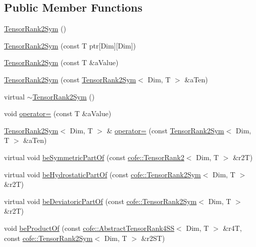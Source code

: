 \subsection*{Public Member Functions}
\begin{DoxyCompactItemize}
\item 
\hyperlink{classcofe_1_1TensorRank2Sym_a5c959003b2f6cd9ece627399bd45835e}{Tensor\-Rank2\-Sym} ()
\item 
\hyperlink{classcofe_1_1TensorRank2Sym_ad009c20f62a3c7164308ced29b4cca99}{Tensor\-Rank2\-Sym} (const T ptr\mbox{[}Dim\mbox{]}\mbox{[}Dim\mbox{]})
\item 
\hyperlink{classcofe_1_1TensorRank2Sym_a41a6d3b947aa0fe214d4c835df39216e}{Tensor\-Rank2\-Sym} (const T \&a\-Value)
\item 
\hyperlink{classcofe_1_1TensorRank2Sym_a47b1dc72944a7061e2a4b5648ad70949}{Tensor\-Rank2\-Sym} (const \hyperlink{classcofe_1_1TensorRank2Sym}{Tensor\-Rank2\-Sym}$<$ Dim, T $>$ \&a\-Ten)
\item 
virtual \hyperlink{classcofe_1_1TensorRank2Sym_aa21acff1313916623564e9eaaca67dbd}{$\sim$\-Tensor\-Rank2\-Sym} ()
\item 
void \hyperlink{classcofe_1_1TensorRank2Sym_a3ada6adac59a547889a8404cc3bc7c39}{operator=} (const T \&a\-Value)
\item 
\hyperlink{classcofe_1_1TensorRank2Sym}{Tensor\-Rank2\-Sym}$<$ Dim, T $>$ \& \hyperlink{classcofe_1_1TensorRank2Sym_a529b71c78891ef9a00c6d2515c812d5c}{operator=} (const \hyperlink{classcofe_1_1TensorRank2Sym}{Tensor\-Rank2\-Sym}$<$ Dim, T $>$ \&a\-Ten)
\item 
virtual void \hyperlink{classcofe_1_1TensorRank2Sym_a1c33be3b42add56b28659f985aa965bf}{be\-Symmetric\-Part\-Of} (const \hyperlink{classcofe_1_1TensorRank2}{cofe\-::\-Tensor\-Rank2}$<$ Dim, T $>$ \&r2\-T)
\item 
virtual void \hyperlink{classcofe_1_1TensorRank2Sym_ab17bf08ed2d08a17877b0616dea15ad0}{be\-Hydrostatic\-Part\-Of} (const \hyperlink{classcofe_1_1TensorRank2Sym}{cofe\-::\-Tensor\-Rank2\-Sym}$<$ Dim, T $>$ \&r2\-T)
\item 
virtual void \hyperlink{classcofe_1_1TensorRank2Sym_a639118d5aa057ab10a57f78855b2dc30}{be\-Deviatoric\-Part\-Of} (const \hyperlink{classcofe_1_1TensorRank2Sym}{cofe\-::\-Tensor\-Rank2\-Sym}$<$ Dim, T $>$ \&r2\-T)
\item 
void \hyperlink{classcofe_1_1TensorRank2Sym_aeb281d2fa552e85b63054784ab9dfb9b}{be\-Product\-Of} (const \hyperlink{classcofe_1_1AbstractTensorRank4SS}{cofe\-::\-Abstract\-Tensor\-Rank4\-S\-S}$<$ Dim, T $>$ \&r4\-T, const \hyperlink{classcofe_1_1TensorRank2Sym}{cofe\-::\-Tensor\-Rank2\-Sym}$<$ Dim, T $>$ \&r2\-S\-T)

\end{DoxyCompactItemize}
